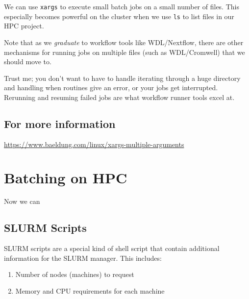 \documentclass[
  letterpaper,
  DIV=11,
  numbers=noendperiod]{scrreprt}
\providecommand{\tightlist}{%
  \setlength{\itemsep}{0pt}\setlength{\parskip}{0pt}}
\begin{document}
\begin{tcolorbox}[enhanced jigsaw, colbacktitle=quarto-callout-note-color!10!white, left=2mm, toprule=.15mm, toptitle=1mm, opacityback=0, bottomrule=.15mm, breakable, leftrule=.75mm, colframe=quarto-callout-note-color-frame, bottomtitle=1mm, titlerule=0mm, coltitle=black, title=\textcolor{quarto-callout-note-color}{\faInfo}\hspace{0.5em}{Why this is important on HPC}, rightrule=.15mm, arc=.35mm, opacitybacktitle=0.6, colback=white]

We can use \texttt{xargs} to execute small batch jobs on a small number
of files. This especially becomes powerful on the cluster when we use
\texttt{ls} to list files in our HPC project.

Note that as we \emph{graduate} to workflow tools like WDL/Nextflow,
there are other mechanisms for running jobs on multiple files (such as
WDL/Cromwell) that we should move to.

Trust me; you don't want to have to handle iterating through a huge
directory and handling when routines give an error, or your jobs get
interrupted. Rerunning and resuming failed jobs are what workflow runner
tools excel at.

\end{tcolorbox}

\subsection{For more information}\label{for-more-information}

\url{https://www.baeldung.com/linux/xargs-multiple-arguments}

\section{Batching on HPC}\label{batching-on-hpc}

Now we can

\subsection{SLURM Scripts}\label{slurm-scripts}

SLURM scripts are a special kind of shell script that contain additional
information for the SLURM manager. This includes:

\begin{enumerate}
\def\labelenumi{\arabic{enumi}.}
\tightlist
\item
  Number of nodes (machines) to request
\item
  Memory and CPU requirements for each machine
\end{enumerate}
\end{document}
